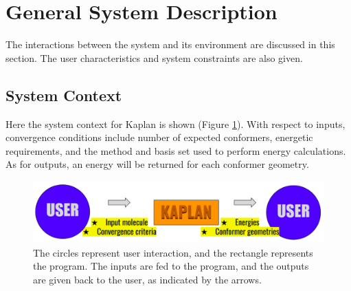 \documentclass[12pt]{article}
\begin{document}
\section{General System Description} \label{3sys-desc}

The interactions between the system and its environment are discussed in this 
section. The user characteristics and system constraints are also given.

\subsection{System Context}


\noindent Here the system context for Kaplan is shown (Figure 
\ref{sys-context}). With 
respect to inputs, convergence conditions include number of expected 
conformers, energetic requirements, and the method and basis set used to 
perform energy calculations. As for outputs, an energy 
will be returned for each 
conformer geometry. 



\begin{figure}[H]
	\includegraphics[width=\textwidth]{sys-context}
	\caption{The circles represent user interaction, and the rectangle 
	represents the program. The inputs are fed to the program, and the 
	outputs are given back to the user, as indicated by the arrows.}
	\label{sys-context}
\end{figure}
\end{document}
